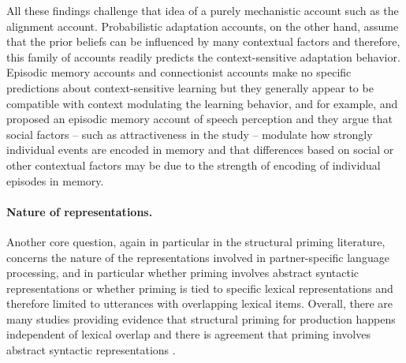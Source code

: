 
All these findings challenge that idea of a purely mechanistic account such as the alignment account. Probabilistic adaptation accounts, on the other hand, assume
that the prior beliefs can be influenced by many contextual factors and therefore, this family of accounts readily predicts the context-sensitive adaptation behavior.
Episodic memory accounts and connectionist accounts make no specific predictions about context-sensitive learning but they generally appear to be compatible with context
modulating the learning behavior, and for example, \textcite{Sumner2013} and \textcite{Sumner2014} proposed an episodic memory account of speech perception and they argue
 that social factors -- such as attractiveness in the \textcite{Babel2012}  study -- modulate how strongly individual events are encoded in memory and that differences based on social
 or other contextual factors may be due to the strength of encoding of individual episodes in memory.
 
\paragraph{Nature of representations.} Another core question, again in particular in the structural priming literature, concerns
the nature of the representations involved in partner-specific language processing, 
and in particular whether priming involves abstract syntactic representations
or whether priming is tied to specific lexical representations and therefore limited to utterances with overlapping lexical items. 
Overall, there are many studies
providing evidence that structural priming for production happens independent of lexical overlap and there is agreement
that priming involves abstract syntactic representations .

